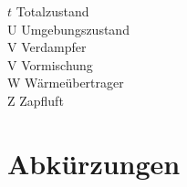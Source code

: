 \begin{tabbing}
    $t$     \>  Totalzustand                                        \\
    U       \>  Umgebungszustand                                    \\
    V       \>  Verdampfer                                          \\
    V       \>  Vormischung                                         \\
    W       \>  Wärmeübertrager                                     \\
    Z       \>  Zapfluft                                            \\

\end{tabbing}

\section*{Abkürzungen}

